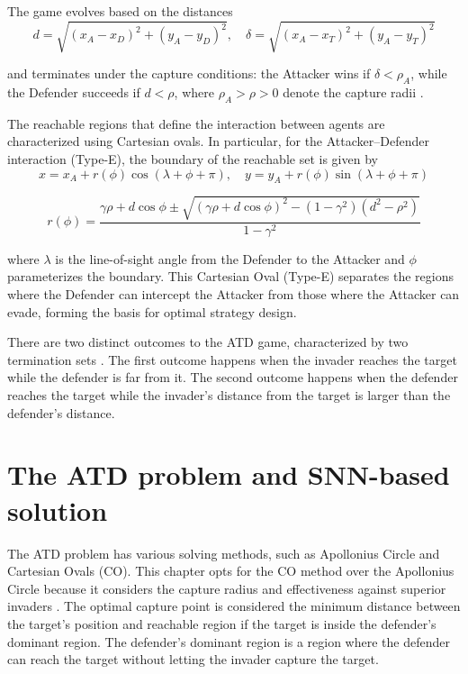 The game evolves based on the distances
\begin{equation}
    d = \sqrt{(x_A - x_D)^2 + (y_A - y_D)^2}, \quad \delta = \sqrt{(x_A - x_T)^2 + (y_A - y_T)^2}
\end{equation}

\noindent and terminates under the capture conditions: the Attacker wins if \(\delta < \rho_A\), while the Defender succeeds if \(d < \rho\), where \(\rho_A > \rho > 0\) denote the capture radii \cite{Ch5_ATD4-5}.

The reachable regions that define the interaction between agents are characterized using Cartesian ovals. In particular, for the Attacker--Defender interaction (Type-E), the boundary of the reachable set is given by \cite{Ch5_ATD4-5}
\begin{equation}
    x = x_A + r(\phi)\cos(\lambda + \phi + \pi), \quad
    y = y_A + r(\phi)\sin(\lambda + \phi + \pi)
\end{equation}

\begin{equation}
    r(\phi) = \frac{\gamma \rho + d\cos\phi \pm \sqrt{(\gamma \rho + d\cos\phi)^2 - (1-\gamma^2)(d^2 - \rho^2)}}{1 - \gamma^2}
\end{equation}

\noindent where \(\lambda\) is the line-of-sight angle from the Defender to the Attacker and \(\phi\) parameterizes the boundary. This Cartesian Oval (Type-E) separates the regions where the Defender can intercept the Attacker from those where the Attacker can evade, forming the basis for optimal strategy design.

There are two distinct outcomes to the ATD game, characterized by two termination sets \cite{Ch5_ATD6}. The first outcome happens when the invader reaches the target while the defender is far from it. The second outcome happens when the defender reaches the target while the invader's distance from the target is larger than the defender's distance.

\section{The ATD problem and SNN-based solution}

The ATD problem has various solving methods, such as Apollonius Circle and Cartesian Ovals (CO). This chapter opts for the CO method over the Apollonius Circle because it considers the capture radius and effectiveness against superior invaders \cite{Ch5_ATD6}. The optimal capture point is considered the minimum distance between the target’s position and reachable region if the target is inside the defender’s dominant region. The defender’s dominant region is a region where the defender can reach the target without letting the invader capture the target.

